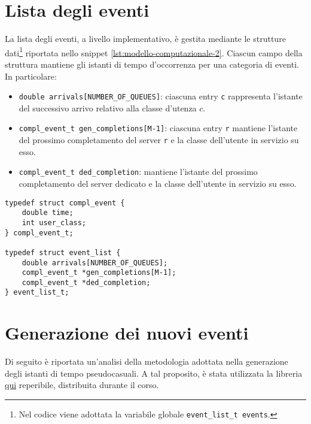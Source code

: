 \section{Lista degli eventi}\label{sec:modello-computazionale-lista-eventi}
La lista degli eventi, a livello implementativo, è gestita mediante le strutture dati\footnote{Nel codice viene adottata la variabile globale \texttt{{\color{code_purple}event\_list\_t} events}.} riportata nello snippet \ref{lst:modello-computazionale-2}.
Ciascun campo della struttura mantiene gli istanti di tempo d'occorrenza per una categoria di eventi. In particolare:
\begin{itemize}
\item \texttt{{\color{code_purple}double} arrivals[NUMBER\_OF\_QUEUES]}: ciascuna entry \texttt{c} rappresenta l'istante del successivo arrivo relativo alla classe d'utenza $c$.
\item \texttt{{\color{code_purple}compl\_event\_t} gen\_completions[M-1]}: ciascuna entry \texttt{r} mantiene l'istante del prossimo completamento del server \texttt{r} e la classe dell'utente in servizio su esso.
\item \texttt{{\color{code_purple}compl\_event\_t} ded\_completion}: mantiene l'istante del prossimo completamento del server dedicato e la classe dell'utente in servizio su esso.
\end{itemize}
\newpage
\begin{lstlisting}[label={lst:modello-computazionale-2}, caption={Struttura dati per la lista degli eventi}]
typedef struct compl_event {
    double time;
    int user_class;
} compl_event_t;

typedef struct event_list {
    double arrivals[NUMBER_OF_QUEUES];  
    compl_event_t *gen_completions[M-1];      
    compl_event_t *ded_completion;      
} event_list_t; 
\end{lstlisting}

\section{Generazione dei nuovi eventi}\label{sec:modello-computazionale-gen-nuovi-eventi}
Di seguito è riportata un'analisi della metodologia adottata nella generazione degli istanti di tempo pseudocasuali. A tal proposito, è stata utilizzata la libreria \href{http://www.math.wm.edu/~leemis/}{qui} reperibile, distribuita durante il corso.

